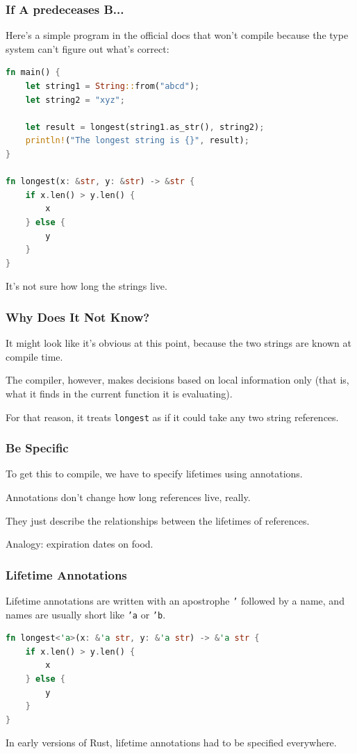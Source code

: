 \begin{frame}[fragile]
\frametitle{If A predeceases B...}


Here's a simple program in the official docs that won't compile because the type system can't figure out what's correct:

\begin{lstlisting}[language=Rust]
fn main() {
    let string1 = String::from("abcd");
    let string2 = "xyz";

    let result = longest(string1.as_str(), string2);
    println!("The longest string is {}", result);
}

fn longest(x: &str, y: &str) -> &str {
    if x.len() > y.len() {
        x
    } else {
        y
    }
}
\end{lstlisting}

It's not sure how long the strings live.

\end{frame}

\begin{frame}
\frametitle{Why Does It Not Know?}

It might look like it's obvious at this point, because the two strings are known at compile time. 

The compiler, however, makes decisions based on local information only (that is, what it finds in the current function it is evaluating). 

For that reason, it treats \texttt{longest} as if it could take any two string references.

\end{frame}

\begin{frame}
\frametitle{Be Specific}

To get this to compile, we have to specify lifetimes using annotations. 

Annotations don't change how long references live, really.

They just describe the relationships between the lifetimes of references.

Analogy: expiration dates on food.

\end{frame}


\begin{frame}[fragile]
\frametitle{Lifetime Annotations}
Lifetime annotations are written with an apostrophe \texttt{'} followed by a name, and names are usually short like \texttt{'a} or \texttt{'b}. 

\begin{lstlisting}[language=Rust]
fn longest<'a>(x: &'a str, y: &'a str) -> &'a str {
    if x.len() > y.len() {
        x
    } else {
        y
    }
}
\end{lstlisting}

In early versions of Rust, lifetime annotations had to be specified everywhere.

\end{frame}

